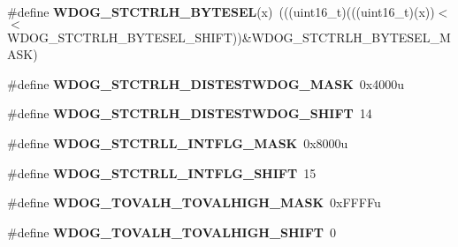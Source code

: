 \begin{DoxyCompactItemize}
\item 
\#define {\bfseries W\+D\+O\+G\+\_\+\+S\+T\+C\+T\+R\+L\+H\+\_\+\+B\+Y\+T\+E\+S\+EL}(x)~(((uint16\+\_\+t)(((uint16\+\_\+t)(x))$<$$<$W\+D\+O\+G\+\_\+\+S\+T\+C\+T\+R\+L\+H\+\_\+\+B\+Y\+T\+E\+S\+E\+L\+\_\+\+S\+H\+I\+FT))\&W\+D\+O\+G\+\_\+\+S\+T\+C\+T\+R\+L\+H\+\_\+\+B\+Y\+T\+E\+S\+E\+L\+\_\+\+M\+A\+SK)\hypertarget{group__WDOG__Register__Masks_ga13958aa7d857b661998e304c5b3b4ea7}{}\label{group__WDOG__Register__Masks_ga13958aa7d857b661998e304c5b3b4ea7}

\item 
\#define {\bfseries W\+D\+O\+G\+\_\+\+S\+T\+C\+T\+R\+L\+H\+\_\+\+D\+I\+S\+T\+E\+S\+T\+W\+D\+O\+G\+\_\+\+M\+A\+SK}~0x4000u\hypertarget{group__WDOG__Register__Masks_gadc235bcbd7644d445d3ca5cb682cdc57}{}\label{group__WDOG__Register__Masks_gadc235bcbd7644d445d3ca5cb682cdc57}

\item 
\#define {\bfseries W\+D\+O\+G\+\_\+\+S\+T\+C\+T\+R\+L\+H\+\_\+\+D\+I\+S\+T\+E\+S\+T\+W\+D\+O\+G\+\_\+\+S\+H\+I\+FT}~14\hypertarget{group__WDOG__Register__Masks_gabc176648bbc119e959823d20c38d3ece}{}\label{group__WDOG__Register__Masks_gabc176648bbc119e959823d20c38d3ece}

\item 
\#define {\bfseries W\+D\+O\+G\+\_\+\+S\+T\+C\+T\+R\+L\+L\+\_\+\+I\+N\+T\+F\+L\+G\+\_\+\+M\+A\+SK}~0x8000u\hypertarget{group__WDOG__Register__Masks_ga28985249246b9ad12b7f4e50d5d1ee46}{}\label{group__WDOG__Register__Masks_ga28985249246b9ad12b7f4e50d5d1ee46}

\item 
\#define {\bfseries W\+D\+O\+G\+\_\+\+S\+T\+C\+T\+R\+L\+L\+\_\+\+I\+N\+T\+F\+L\+G\+\_\+\+S\+H\+I\+FT}~15\hypertarget{group__WDOG__Register__Masks_ga672e303cca0aaea64e48b5e632a2e666}{}\label{group__WDOG__Register__Masks_ga672e303cca0aaea64e48b5e632a2e666}

\item 
\#define {\bfseries W\+D\+O\+G\+\_\+\+T\+O\+V\+A\+L\+H\+\_\+\+T\+O\+V\+A\+L\+H\+I\+G\+H\+\_\+\+M\+A\+SK}~0x\+F\+F\+F\+Fu\hypertarget{group__WDOG__Register__Masks_ga3b934300a204f2b11fefc7961dc25f55}{}\label{group__WDOG__Register__Masks_ga3b934300a204f2b11fefc7961dc25f55}

\item 
\#define {\bfseries W\+D\+O\+G\+\_\+\+T\+O\+V\+A\+L\+H\+\_\+\+T\+O\+V\+A\+L\+H\+I\+G\+H\+\_\+\+S\+H\+I\+FT}~0\hypertarget{group__WDOG__Register__Masks_ga6729532c2b047c0d3327ffcf7357825c}{}\label{group__WDOG__Register__Masks_ga6729532c2b047c0d3327ffcf7357825c}


\end{DoxyCompactItemize}
